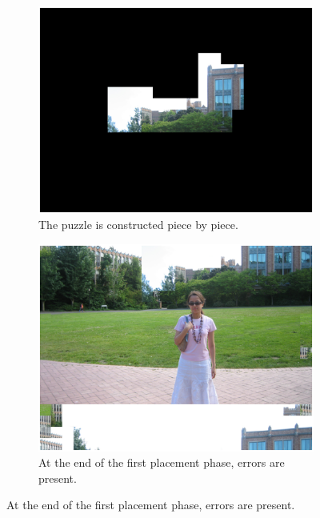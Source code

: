 \begin{figure}[H]
    \centering
    \begin{subfigure}{0.25\textheight}
        \centering
        \includegraphics[width=\textwidth]{fig/algo_start.eps}
        \caption{The puzzle is constructed piece by piece.}    
        \label{fig:placement1}
    \end{subfigure}%
    
    \begin{subfigure}[b]{0.25\textheight}
        \centering
        \includegraphics[width=\textwidth]{fig/algo_fin1.eps}
        \caption{At the end of the first placement phase, errors are present.}    
        \label{fig:placement2}
    \end{subfigure}%
    

\end{figure}
